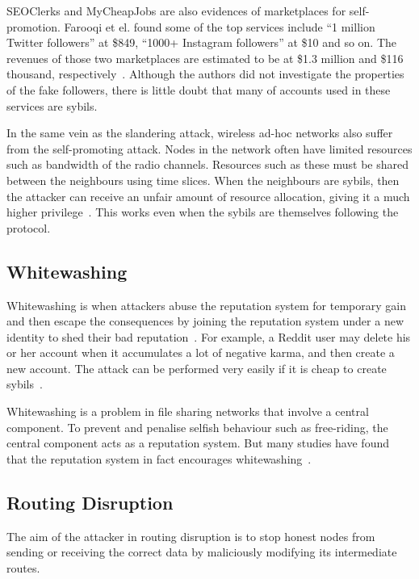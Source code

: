 
SEOClerks and MyCheapJobs are also evidences of marketplaces for self-promotion.
Farooqi et el. found some of the top services include ``1 million Twitter
followers'' at \$849, ``1000+ Instagram followers'' at \$10 and so on. The
revenues of those two marketplaces are estimated to be at \$1.3 million and
\$116 thousand, respectively~\cite{farooqi2015characterizing}. Although the
authors did not investigate the properties of the fake followers, there is
little doubt that many of accounts used in these services are sybils.

In the same vein as the slandering attack, wireless ad-hoc networks also suffer
from the self-promoting attack. Nodes in the network often have limited
resources such as bandwidth of the radio channels. Resources such as these must
be shared between the neighbours using time slices. When the neighbours are
sybils, then the attacker can receive an unfair amount of resource allocation,
giving it a much higher privilege~\cite{newsome2004sybil}. This works even when
the sybils are themselves following the protocol.

\subsection{Whitewashing}
Whitewashing is when attackers abuse the reputation system for temporary gain
and then escape the consequences by joining the reputation system under a new
identity to shed their bad reputation~\cite{marti2006taxonomy}. For example, a
Reddit user may delete his or her account when it accumulates a lot of negative
karma, and then create a new account. The attack can be performed very easily if
it is cheap to create sybils~\cite{hoffman2009survey}.

Whitewashing is a problem in file sharing networks that involve a central
component. To prevent and penalise selfish behaviour such as free-riding, the
central component acts as a reputation system. But many studies have found that
the reputation system in fact encourages whitewashing~\cite{feldman2004free,
  yang2005empirical}.

\subsection{Routing Disruption}\label{sec:routing-disruption}
The aim of the attacker in routing disruption is to stop honest nodes from
sending or receiving the correct data by maliciously modifying its intermediate
routes.

